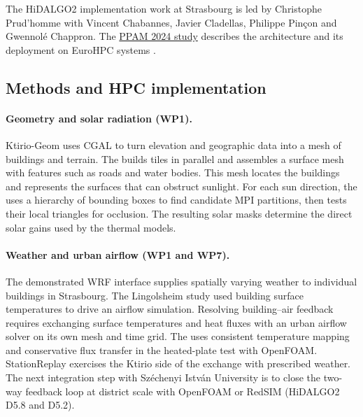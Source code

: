 The HiDALGO2 implementation work at Strasbourg is led by
Christophe Prud'homme with Vincent Chabannes, Javier Cladellas,
Philippe Pinçon and Gwennolé Chappron. The
\href{https://doi.org/10.1007/978-3-031-85703-4_2}{PPAM 2024 study}
describes the architecture and its deployment on EuroHPC systems
\cite{prudhomme_ktirio_2024}.

\subsection{Methods and HPC implementation}

\paragraph{Geometry and solar radiation (WP1).}
Ktirio-Geom uses CGAL to turn elevation and geographic data into
a mesh of buildings and terrain. The
builds tiles in parallel and assembles a surface mesh with features
such as roads and water bodies. This mesh locates the buildings and
represents the surfaces that can obstruct sunlight. For each sun
direction, the
uses a hierarchy of bounding boxes to find candidate MPI partitions,
then tests their local triangles for occlusion. The resulting solar
masks determine the direct solar gains used by the thermal models.

\paragraph{Weather and urban airflow (WP1 and WP7).}
The demonstrated WRF interface supplies spatially varying weather
to individual buildings in Strasbourg. The Lingolsheim study used
building surface temperatures to drive an airflow simulation. Resolving building--air
feedback requires exchanging surface temperatures and heat fluxes
with an urban airflow solver on its own mesh and time grid. The
uses consistent temperature mapping and conservative flux transfer
in the heated-plate test with OpenFOAM. StationReplay exercises
the Ktirio side of the exchange with prescribed weather.
The next integration step with Széchenyi István University is to
close the two-way feedback loop at district scale with OpenFOAM or
RedSIM (HiDALGO2 D5.8 and D5.2).

